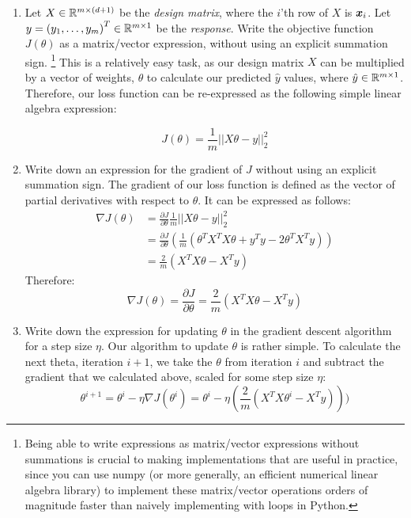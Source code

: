 \documentclass{article}
\begin{document}
\begin{enumerate}
  \setcounter{enumi}{\value{saveenum}}
\item Let $X\in\mathbb{R}^{m\times\left(d+1\right)}$ be the \emph{design matrix}, where the $i$'th row of $X$ is $\boldsymbol{x}_{i}$. Let $y=\left(y_{1},\ldots,y_{m}\right)^{T}\in\mathbb{R}^{m\times1}$
be the \emph{response}. Write the objective function $J(\theta)$ as
a matrix/vector expression, without using an explicit summation sign.
\footnote{Being able to write expressions as matrix/vector expressions without
summations is crucial to making implementations that are useful in
practice, since you can use numpy (or more generally, an efficient
numerical linear algebra library) to implement these matrix/vector
operations orders of magnitude faster than naively implementing with
loops in Python.} 
\subitem
This is a relatively easy task, as our design matrix $X$ can be multiplied by a vector of weights, $\theta$ to calculate our predicted $\hat{y}$ values, where $\hat{y} \in \mathbb{R}^{m\times1}$. Therefore, our loss function can be re-expressed as the following simple linear algebra expression:

$$J(\theta) =\frac{1}{m}|| X\theta -y ||_2^2$$

\item Write down an expression for the gradient of $J$ without using an explicit summation sign. 
\subitem
The gradient of our loss function is defined as the vector of partial derivatives with respect to $\theta$. It can be expressed as follows:
\begin{equation}
    \begin{split}
        \nabla J(\theta) &= \frac{\partial J}{\partial \theta} \frac{1}{m}|| X\theta -y ||_2^2 \\
        &= \frac{\partial J}{\partial \theta} (\frac{1}{m}(\theta^TX^TX\theta + y^Ty - 2\theta^TX^Ty)) \\
        &= \frac{2}{m}(X^TX\theta - X^Ty)
    \end{split}
\end{equation}
Therefore:
$$
\nabla J(\theta) = \frac{\partial J}{\partial \theta} = \frac{2}{m}(X^TX\theta - X^Ty)
$$

\item Write down the expression for updating $\theta$ in the gradient descent
algorithm for a step size $\eta$.
\subitem
Our algorithm to update $\theta$ is rather simple. To calculate the next theta, iteration $i+1$, we take the $\theta$ from iteration $i$ and subtract the gradient that we calculated above, scaled for some step size $\eta$:
$$\theta^{i+1} = \theta^i - \eta \nabla J(\theta^i) = \theta^i - \eta (\frac{2}{m}(X^TX\theta^i - X^Ty)))$$



\end{enumerate}
\end{document}
